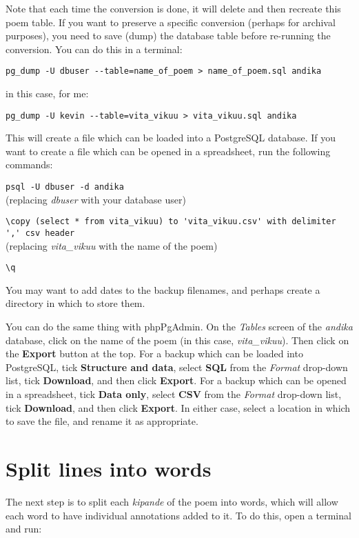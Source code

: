Note that each time the conversion is done, it will delete and then recreate this poem table.  If you want to preserve a specific conversion (perhaps for archival purposes), you need to save (dump) the database table before re-running the conversion.  You can do this in a terminal:

\verb|pg_dump -U dbuser --table=name_of_poem > name_of_poem.sql andika|

in this case, for me:

\verb|pg_dump -U kevin --table=vita_vikuu > vita_vikuu.sql andika|

This will create a file which can be loaded into a PostgreSQL database.  If you want to create a file which can be opened in a spreadsheet, run the following commands:

\verb|psql -U dbuser -d andika|\\
(replacing \textit{dbuser} with your database user)

\verb|\copy (select * from vita_vikuu) to 'vita_vikuu.csv' with delimiter ',' csv header|\\
(replacing \textit{vita_vikuu} with the name of the poem)

\verb|\q|

You may want to add dates to the backup filenames, and perhaps create a directory in which to store them.

You can do the same thing with phpPgAdmin.  On the \textit{Tables} screen of the \textit{andika} database, click on the name of the poem (in this case, \textit{vita_vikuu}).  Then click on the \textbf{Export} button at the top.  For a backup which can be loaded into PostgreSQL, tick \textbf{Structure and data}, select \textbf{SQL} from the \textit{Format} drop-down list, tick \textbf{Download}, and then click \textbf{Export}.  For a backup which can be opened in a spreadsheet, tick \textbf{Data only}, select \textbf{CSV} from the \textit{Format} drop-down list, tick \textbf{Download}, and then click \textbf{Export}.  In either case, select a location in which to save the file, and rename it as appropriate.


\section{Split lines into words}

The next step is to split each \textit{kipande} of the poem into words, which will allow each word to have individual annotations added to it.  To do this, open a terminal and run:

